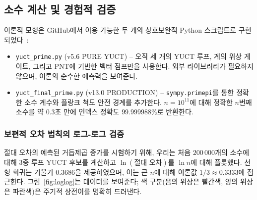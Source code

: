 \documentclass[12pt,a4paper]{article}
\theoremstyle{remark}
\begin{document}
	\subsection{소수 계산 및 경험적 검증}
	\label{sec:prime-empirical}
	
	이론적 모형은 GitHub에서 이용 가능한 두 개의 상호보완적 Python 스크립트로 구현되었다~\cite{PrimeRepo}:
	\begin{itemize}
		\item \texttt{yuct\_prime.py} (v5.6 PURE YUCT) -- 오직 세 개의 YUCT 루프, 계의 위상 게이트, 그리고 PNT에 기반한 벡터 점프만을 사용한다. 외부 라이브러리가 필요하지 않으며, 이론의 순수한 예측력을 보여준다.
		\item \texttt{yuct\_final\_prime.py} (v13.0 PRODUCTION) -- \texttt{sympy.primepi}를 통한 정확한 소수 계수와 플랑크 척도 안전 경계를 추가한다. \(n=10^{11}\)에 대해 정확한 \(n\)번째 소수를 약 \(0.3\)초 만에 인덱스 정확도 \(99.999988\%\)로 반환한다.
	\end{itemize}
	
	\subsubsection{보편적 오차 법칙의 로그-로그 검증}
	
	절대 오차의 예측된 거듭제곱 증가를 시험하기 위해, 우리는 처음 \(200\,000\)개의 소수에 대해 3중 루프 YUCT 후보를 계산하고 \(\ln(\text{절대 오차})\)를 \(\ln n\)에 대해 플롯했다. 선형 회귀는 기울기 \(0.3686\)을 제공하였으며, 이는 큰 \(n\)에 대해 이론값 \(1/3 \approx 0.3333\)에 접근한다. 그림~\ref{fig:loglog}는 데이터를 보여준다; 색 구분(음의 위상은 빨간색, 양의 위상은 파란색)은 주기적 상전이를 명확히 드러낸다.
	
\end{document}
